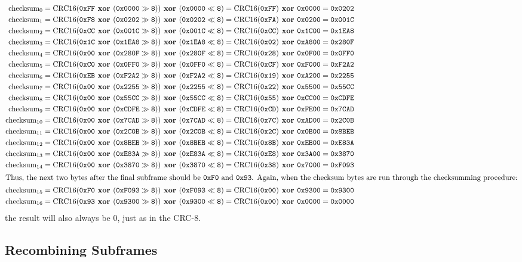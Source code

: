 {
\begin{align*}
\CRCSIXTEEN{0}{0xFF}{0x0000}{0xFF}{0x0000}{0x0202} \\
\CRCSIXTEEN{1}{0xF8}{0x0202}{0xFA}{0x0200}{0x001C} \\
\CRCSIXTEEN{2}{0xCC}{0x001C}{0xCC}{0x1C00}{0x1EA8} \\
\CRCSIXTEEN{3}{0x1C}{0x1EA8}{0x02}{0xA800}{0x280F} \\
\CRCSIXTEEN{4}{0x00}{0x280F}{0x28}{0x0F00}{0x0FF0} \\
\CRCSIXTEEN{5}{0xC0}{0x0FF0}{0xCF}{0xF000}{0xF2A2} \\
\CRCSIXTEEN{6}{0xEB}{0xF2A2}{0x19}{0xA200}{0x2255} \\
\CRCSIXTEEN{7}{0x00}{0x2255}{0x22}{0x5500}{0x55CC} \\
\CRCSIXTEEN{8}{0x00}{0x55CC}{0x55}{0xCC00}{0xCDFE} \\
\CRCSIXTEEN{9}{0x00}{0xCDFE}{0xCD}{0xFE00}{0x7CAD} \\
\CRCSIXTEEN{10}{0x00}{0x7CAD}{0x7C}{0xAD00}{0x2C0B} \\
\CRCSIXTEEN{11}{0x00}{0x2C0B}{0x2C}{0x0B00}{0x8BEB} \\
\CRCSIXTEEN{12}{0x00}{0x8BEB}{0x8B}{0xEB00}{0xE83A} \\
\CRCSIXTEEN{13}{0x00}{0xE83A}{0xE8}{0x3A00}{0x3870} \\
\CRCSIXTEEN{14}{0x00}{0x3870}{0x38}{0x7000}{0xF093} \\
\intertext{Thus, the next two bytes after the final subframe should be
\texttt{0xF0} and \texttt{0x93}.
Again, when the checksum bytes are run through the checksumming procedure:}
\CRCSIXTEEN{15}{0xF0}{0xF093}{0x00}{0x9300}{0x9300} \\
\CRCSIXTEEN{16}{0x93}{0x9300}{0x00}{0x0000}{0x0000}
\end{align*}
the result will also always be 0, just as in the CRC-8.
}

\clearpage

\subsection{Recombining Subframes}
\label{flac:recombine_subframes}
{

}
\clearpage

